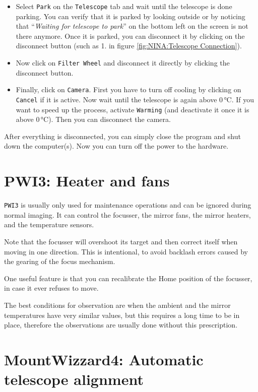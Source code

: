 \documentclass[a4paper, 11pt, fleqn]{memoir}
\begin{document}
\begin{itemize}
    \item Select \texttt{Park} on the \texttt{Telescope} tab and wait until the telescope is done parking. You can verify that it is parked by looking outside or by noticing that ``\textit{Waiting for telescope to park}'' on the bottom left on the screen is not there anymore. Once it is parked, you can disconnect it by clicking on the disconnect button (such as 1. in figure \ref{fig:NINA:Telescope Connection}).
    \item Now click on \texttt{Filter Wheel} and disconnect it directly by clicking the disconnect button.
    \item Finally, click on \texttt{Camera}. First you have to turn off cooling by clicking on \texttt{Cancel} if it is active. Now wait until the telescope is again above $0\,\si{\degreeCelsius}$. If you want to speed up the process, activate \texttt{Warming} (and deactivate it once it is above $0\,\si{\degreeCelsius}$). Then you can disconnect the camera.
\end{itemize}

After everything is disconnected, you can simply close the program and shut down the computer(s). Now you can turn off the power to the hardware.



\section{PWI3: Heater and fans}
\texttt{PWI3} is usually only used for maintenance operations and can be ignored during normal imaging.
It can control the focusser, the mirror fans, the mirror heaters, and the temperature sensors.

Note that the focusser will overshoot its target and then correct itself when moving in one direction.
This is intentional, to avoid backlash errors caused by the gearing of the focus mechanism.

One useful feature is that you can recalibrate the Home position of the focusser, in case it ever refuses to move.

The best conditions for observation are when the ambient and the mirror temperatures have very similar values, but this requires a long time to be in place, therefore the observations are usually done without this prescription.

\section{MountWizzard4: Automatic telescope alignment}
\end{document}
